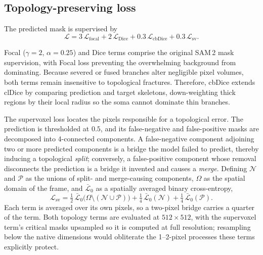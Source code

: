 \documentclass{article}
\begin{document}
\subsection{Topology-preserving loss}
\label{sec:loss}

The predicted mask is supervised by
\begin{equation}
\mathcal{L} = 3\,\mathcal{L}_{\text{focal}} + 2\,\mathcal{L}_{\text{Dice}}
 + 0.3\,\mathcal{L}_{\text{cbDice}} + 0.3\,\mathcal{L}_{\text{sv}} .
\label{eq:loss}
\end{equation}

Focal \cite{lin2017focal} ($\gamma=2$, $\alpha=0.25$) and Dice \cite{milletari2016vnet} terms comprise the original SAM\,2 mask supervision, with Focal loss preventing the overwhelming background from dominating. Because severed or fused branches alter negligible pixel volumes, both terms remain insensitive to topological fractures. Therefore, cbDice \cite{shi2024cbdice} extends clDice \cite{shit2021cldice} by comparing prediction and target skeletons, down-weighting thick regions by their local radius so the soma cannot dominate thin branches.

The supervoxel loss \cite{grim2025supervoxel} locates the pixels responsible
for a topological error. The prediction is thresholded at $0.5$, and its
false-negative and false-positive masks are decomposed into 4-connected
components. A
false-negative component adjoining two or more predicted components is a bridge the model failed to predict, thereby inducing a topological \emph{split}; conversely, a false-positive component whose removal disconnects the prediction is a bridge it invented and causes a \emph{merge}. Defining
$\mathcal{N}$ and $\mathcal{P}$ as the unions of split- and merge-causing components, $\Omega$ as the spatial domain of the frame, and $\bar{\mathcal{L}}_0$ as a spatially averaged binary cross-entropy,
\begin{equation}
\mathcal{L}_{\text{sv}} =
 \tfrac12\,\bar{\mathcal{L}}_0\big(\Omega\setminus(\mathcal{N}\cup\mathcal{P})\big)
 + \tfrac14\,\bar{\mathcal{L}}_0(\mathcal{N})
 + \tfrac14\,\bar{\mathcal{L}}_0(\mathcal{P}).
\label{eq:sv}
\end{equation}
Each term is averaged over its own pixels, so a two-pixel bridge carries a quarter of the term. Both topology terms are evaluated at $512 \times 512$, with the supervoxel term's critical masks upsampled so it is computed at full resolution; resampling below the native dimensions would obliterate the 1--2-pixel processes these terms explicitly protect.
\end{document}
